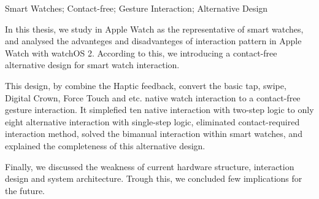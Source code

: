 
\begin{abstract}{智能手表；非接触式；手势交互；备择设计}


本文以现有智能手表产品的代表 Apple Watch 为例，对 Apple Watch 上的交互模式的优缺点进行了全面的分析，并据此给出了一套非接触式的备择设计。其配合了 Haptic Engine 对用户的直观震动反馈，完成了对基础点按、滑动、Digital Crown、Force Touch等系列原生交互的非接触式手势交互设计，此设计将嵌套两步逻辑的十种原生交互简化为了单步逻辑上的八种备择交互，且消除了接触式交互的依赖，解决了现有交互中对双手依赖的缺陷，并同时说明了给出的备择设计的交互完备性。最后，本文对设计的硬件结构、交互方式和系统架构的现有缺陷进行了讨论，并从中得到的启示，给出了可行的解决思路。
\end{abstract}
\cleardoublepage
{} %
\begin{abstractEng}{Smart Watches; Contact-free; Gesture Interaction; Alternative Design}

In this thesis, we study in Apple Watch as the representative of smart watches, and analysed the advanteges and disadvanteges of interaction pattern in Apple Watch with watchOS 2. According to this, we introducing a contact-free alternative design for smart watch interaction.

This design, by combine the Haptic feedback, convert the basic tap, swipe, Digital Crown, Force Touch and etc. native watch interaction to a contact-free gesture interaction. It simplefied ten native interaction with two-step logic to only eight alternative interaction with single-step logic, eliminated contact-required interaction method, solved the bimanual interaction within smart watches, and explained the completeness of this alternative design.

Finally, we discussed the weakness of current hardware structure, interaction design and system architecture. Trough this, we concluded few implications for the future.
\end{abstractEng}
